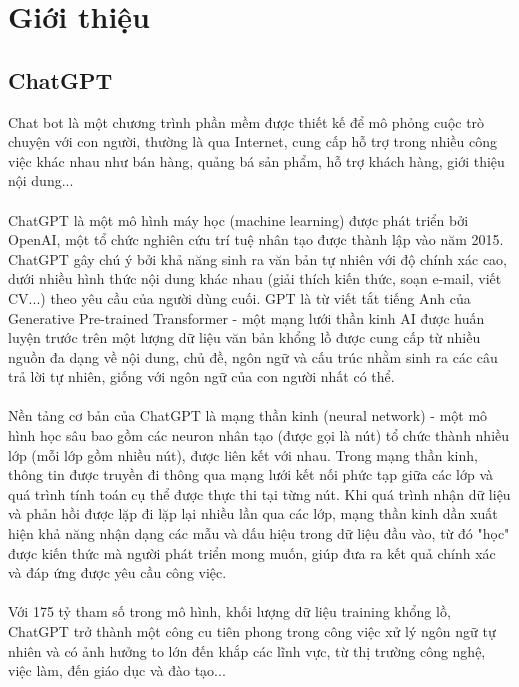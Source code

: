 \documentclass[a4paper, 12pt]{article}
\begin{document}
	\section{Giới thiệu}
		\subsection{ChatGPT}
			Chat bot là một chương trình phần mềm được thiết kế để mô phỏng cuộc trò chuyện với con người, thường là qua Internet, cung cấp hỗ trợ trong nhiều công việc khác nhau như bán hàng, quảng bá sản phẩm, hỗ trợ khách hàng, giới thiệu nội dung...
			\\
			\\
			ChatGPT là một mô hình máy học (machine learning) được phát triển bởi OpenAI, một tổ chức nghiên cứu trí tuệ nhân tạo được thành lập vào năm 2015. ChatGPT gây chú ý bởi khả năng sinh ra văn bản tự nhiên với độ chính xác cao, dưới nhiều hình thức nội dung khác nhau (giải thích kiến thức, soạn e-mail, viết CV...) theo yêu cầu của người dùng cuối. GPT là từ viết tắt tiếng Anh của Generative Pre-trained Transformer - một mạng lưới thần kinh AI được huấn luyện trước trên một lượng dữ liệu văn bản khổng lồ được cung cấp từ nhiều nguồn đa dạng về nội dung, chủ đề, ngôn ngữ và cấu trúc nhằm sinh ra các câu trả lời tự nhiên, giống với ngôn ngữ của con người nhất có thể.
			\\
			\\
			Nền tảng cơ bản của ChatGPT là mạng thần kinh (neural network) - một mô hình học sâu bao gồm các neuron nhân tạo (được gọi là nút) tổ chức thành nhiều lớp (mỗi lớp gồm nhiều nút), được liên kết với nhau. Trong mạng thần kinh, thông tin được truyền đi thông qua mạng lưới kết nối phức tạp giữa các lớp và quá trình tính toán cụ thể được thực thi tại từng nút. Khi quá trình nhận dữ liệu và phản hồi được lặp đi lặp lại nhiều lần qua các lớp, mạng thần kinh dần xuất hiện khả năng nhận dạng các mẫu và dấu hiệu trong dữ liệu đầu vào, từ đó "học" được kiến thức mà người phát triển mong muốn, giúp đưa ra kết quả chính xác và đáp ứng được yêu cầu công việc.
			\\
			\\
			Với 175 tỷ tham số trong mô hình, khối lượng dữ liệu training khổng lồ, ChatGPT trở thành một công cu tiên phong trong công việc xử lý ngôn ngữ tự nhiên và có ảnh hưởng to lớn đến khắp các lĩnh  vực, từ thị trường công nghệ, việc làm, đến giáo dục và đào tạo...
			
		
\end{document}
